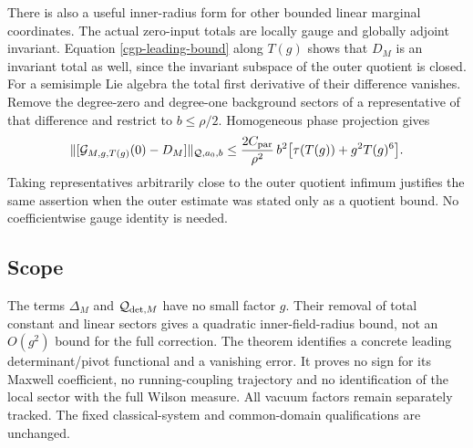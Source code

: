 There is also a useful inner-radius form for other bounded
linear marginal coordinates. The actual zero-input totals
are locally gauge and globally adjoint invariant.
Equation \eqref{cgp-leading-bound} along $T(g)$ shows that
$D_M$ is an invariant total as well, since the invariant
subspace of the outer quotient is closed. For a semisimple
Lie algebra the total first derivative of their difference
vanishes. Remove the degree-zero and degree-one background
sectors of a representative of that difference and restrict
to $b\le\rho/2$. Homogeneous phase projection gives
\begin{equation}
 \|[\mathcal G_{M,g,T(g)}(0)-D_M]\|_{\mathcal Q,a_0,b}
 \le \frac{2C_{\rm par}}{\rho^2}\,
       b^2\bigl[\tau(T(g))+g^2T(g)^6\bigr].
 \label{cgp-inner-bound}
\end{equation}
Taking representatives arbitrarily close to the outer
quotient infimum justifies the same assertion when the
outer estimate was stated only as a quotient bound.
No coefficientwise gauge identity is needed.

\subsection{Scope}
\label{cgp-scope-section}

The terms $\Delta_M$ and $\mathcal Q_{{\rm det},M}$ have no
small factor $g$. Their removal of total constant and linear
sectors gives a quadratic inner-field-radius bound, not an
$O(g^2)$ bound for the full correction.
The theorem identifies a concrete leading determinant/pivot
functional and a vanishing error. It proves no sign for its
Maxwell coefficient, no running-coupling trajectory and no
identification of the local sector with the full Wilson measure.
All vacuum factors remain separately tracked. The fixed
classical-system and common-domain qualifications are unchanged.
